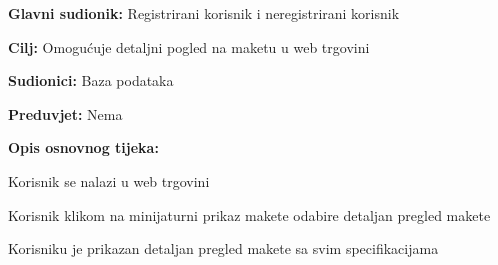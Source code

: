 					\noindent {}
					\begin{packed_item}
						
						\item \textbf{Glavni sudionik: }Registrirani korisnik i neregistrirani korisnik
						\item  \textbf{Cilj:} Omogućuje detaljni pogled na maketu u web trgovini
						\item  \textbf{Sudionici:} Baza podataka
						\item  \textbf{Preduvjet:} Nema
						\item  \textbf{Opis osnovnog tijeka:}
						
						\item[] \begin{packed_enum}
							\item Korisnik se nalazi u web trgovini
							\item Korisnik klikom na minijaturni prikaz makete odabire detaljan pregled makete
							\item Korisniku je prikazan detaljan pregled makete sa svim specifikacijama
						\end{packed_enum}
						
					\end{packed_item}
				
